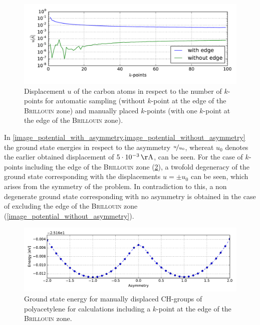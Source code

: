\begin{figure}
	\centering
	\includegraphics[width = 13cm]{Images/polyacetylene/convergence/polyacetylene_displacement}
	\caption{Displacement $u$ of the carbon atoms in respect to the number of $k$-points for automatic sampling (without $k$-point at the edge of the \textsc{Brillouin} zone) and manually placed $k$-points (with one $k$-point at the edge of the \textsc{Brillouin} zone).}
	\label{image_k_point_sampling_assymetry}
\end{figure}
In \cref{image_potential_with_asymmetry,image_potential_without_asymmetry} the ground state energies in respect to the asymmetry $\nicefrac{u}{u_0}$, whereat $u_0$ denotes the earlier obtained displacement of  $\unit[5\cdot10^{-3}]{\AA}$, can be seen. For the case of $k$-points including the edge of the \textsc{Brillouin} zone (\cref{image_potential_with_asymmetry}), a twofold degeneracy of the ground state corresponding with the displacements $u = \pm u_0$ can be seen, which arises from the symmetry of the problem. In contradiction to this, a non degenerate ground state corresponding with no asymmetry is obtained in the case of excluding the edge of the \textsc{Brillouin} zone (\cref{image_potential_without_asymmetry}).\\
\begin{figure}
	\centering
	\includegraphics[width = 13cm]{Images/polyacetylene/convergence/Potential_with_asymmetry}
	\caption{Ground state energy for manually displaced CH-groups of polyacetylene for calculations including a $k$-point at the edge of the \textsc{Brillouin} zone.}
	\label{image_potential_with_asymmetry}
\end{figure}
